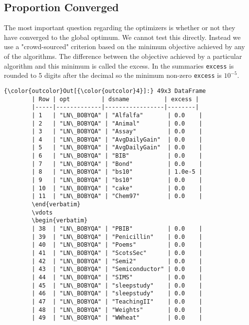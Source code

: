 \documentclass[article]{jss}
\begin{document}
\subsection[Convergence]{Proportion Converged}



The most important question regarding the optimizers is whether or not they have converged to the global optimum. We cannot test this directly. Instead we use a "crowd-sourced" criterion based on the minimum objective achieved by any of the algorithms. The difference between the objective achieved by a particular algorithm and this minimum is called the excess. In the summaries \texttt{excess} is rounded to 5 digits after the decimal so the minimum non-zero \texttt{excess} is $10^{-5}$.


 \begin{Verbatim}[commandchars=\\\{\}]
{\color{outcolor}Out[{\color{outcolor}4}]:} 49x3 DataFrame
        | Row | opt         | dsname          | excess |
        |-----|-------------|-----------------|--------|
        | 1   | "LN\_BOBYQA" | "Alfalfa"       | 0.0    |
        | 2   | "LN\_BOBYQA" | "Animal"        | 0.0    |
        | 3   | "LN\_BOBYQA" | "Assay"         | 0.0    |
        | 4   | "LN\_BOBYQA" | "AvgDailyGain"  | 0.0    |
        | 5   | "LN\_BOBYQA" | "AvgDailyGain"  | 0.0    |
        | 6   | "LN\_BOBYQA" | "BIB"           | 0.0    |
        | 7   | "LN\_BOBYQA" | "Bond"          | 0.0    |
        | 8   | "LN\_BOBYQA" | "bs10"          | 1.0e-5 |
        | 9   | "LN\_BOBYQA" | "bs10"          | 0.0    |
        | 10  | "LN\_BOBYQA" | "cake"          | 0.0    |
        | 11  | "LN\_BOBYQA" | "Chem97"        | 0.0    |
        \end{verbatim}
        \vdots
        \begin{verbatim}
        | 38  | "LN\_BOBYQA" | "PBIB"          | 0.0    |
        | 39  | "LN\_BOBYQA" | "Penicillin"    | 0.0    |
        | 40  | "LN\_BOBYQA" | "Poems"         | 0.0    |
        | 41  | "LN\_BOBYQA" | "ScotsSec"      | 0.0    |
        | 42  | "LN\_BOBYQA" | "Semi2"         | 0.0    |
        | 43  | "LN\_BOBYQA" | "Semiconductor" | 0.0    |
        | 44  | "LN\_BOBYQA" | "SIMS"          | 0.0    |
        | 45  | "LN\_BOBYQA" | "sleepstudy"    | 0.0    |
        | 46  | "LN\_BOBYQA" | "sleepstudy"    | 0.0    |
        | 47  | "LN\_BOBYQA" | "TeachingII"    | 0.0    |
        | 48  | "LN\_BOBYQA" | "Weights"       | 0.0    |
        | 49  | "LN\_BOBYQA" | "WWheat"        | 0.0    |
\end{Verbatim}
\end{document}
